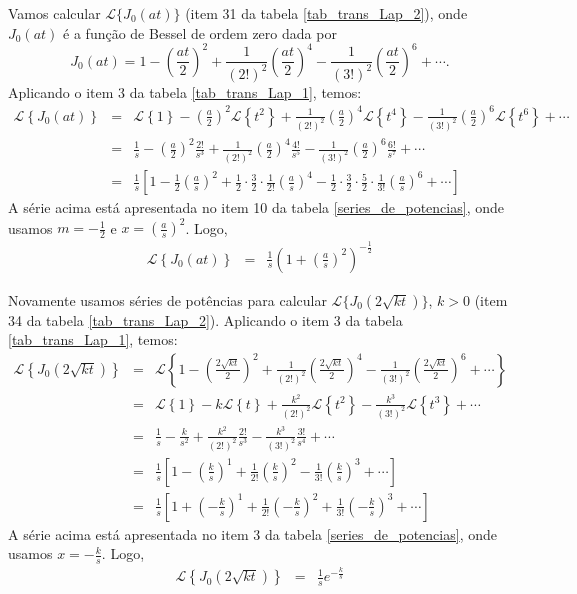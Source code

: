 \documentclass[Main.tex]{subfiles}
\begin{document}
\begin{ex}Vamos calcular $\mathcal{L}\{J_0(at)\}$ (item 31 da tabela \ref{tab_trans_Lap_2}), onde $J_0(at)$ é a função de Bessel de ordem zero dada por
$$
J_0(at)=1-\left(\frac{at}{2}\right)^2+\frac{1}{(2!)^2}\left(\frac{at}{2}\right)^4-\frac{1}{(3!)^2}\left(\frac{at}{2}\right)^6+\cdots.
$$
Aplicando o item 3 da tabela \ref{tab_trans_Lap_1}, temos:
\begin{eqnarray*}
\mathcal{L}\left\{J_0(at)\right\}&=&\mathcal{L}\left\{1\right\}-\left(\frac{a}{2}\right)^2\mathcal{L}\left\{t^2\right\}+\frac{1}{(2!)^2}\left(\frac{a}{2}\right)^4\mathcal{L}\left\{t^4\right\}-\frac{1}{(3!)^2}\left(\frac{a}{2}\right)^6\mathcal{L}\left\{t^6\right\}+\cdots\\
&=&\frac{1}{s}-\left(\frac{a}{2}\right)^2\frac{2!}{s^3}+\frac{1}{(2!)^2}\left(\frac{a}{2}\right)^4\frac{4!}{s^5}-\frac{1}{(3!)^2}\left(\frac{a}{2}\right)^6\frac{6!}{s^7}+\cdots\\
&=&\frac{1}{s}\left[1-\frac{1}{2}\left(\frac{a}{s}\right)^2+\frac{1}{2}\cdot \frac{3}{2}\cdot \frac{1}{2!}\left(\frac{a}{s}\right)^4-\frac{1}{2}\cdot\frac{3}{2}\cdot \frac{5}{2}\cdot\frac{1}{3!} \left(\frac{a}{s}\right)^6+\cdots\right]
\end{eqnarray*}
A série acima está apresentada no item 10 da tabela \ref{series_de_potencias}, onde usamos $m=-\frac{1}{2}$ e $x=\left(\frac{a}{s}\right)^2$. Logo,
\begin{eqnarray*}
\mathcal{L}\left\{J_0(at)\right\}&=&\frac{1}{s}\left(1+\left(\frac{a}{s}\right)^2\right)^{-\frac{1}{2}}
\end{eqnarray*}
\end{ex}
\begin{ex}Novamente usamos séries de potências para calcular $\mathcal{L}\{J_0(2\sqrt{kt})\}$, $k>0$ (item 34 da tabela \ref{tab_trans_Lap_2}). Aplicando o item 3 da tabela \ref{tab_trans_Lap_1}, temos:
\begin{eqnarray*}
\mathcal{L}\left\{J_0(2\sqrt{kt})\right\}&=&\mathcal{L}\left\{1-\left(\frac{2\sqrt{kt}}{2}\right)^2+\frac{1}{(2!)^2}\left(\frac{2\sqrt{kt}}{2}\right)^4-\frac{1}{(3!)^2}\left(\frac{2\sqrt{kt}}{2}\right)^6+\cdots\right\}\\
&=&\mathcal{L}\left\{1\right\}-k\mathcal{L}\left\{t\right\}+\frac{k^2}{(2!)^2}\mathcal{L}\left\{t^2\right\}-\frac{k^3}{(3!)^2}\mathcal{L}\left\{t^3\right\}+\cdots\\
&=&\frac{1}{s}-\frac{k}{s^2}+\frac{k^2}{(2!)^2}\frac{2!}{s^3}-\frac{k^3}{(3!)^2}\frac{3!}{s^4}+\cdots\\
&=&\frac{1}{s}\left[1-\left(\frac{k}{s}\right)^1+\frac{1}{2!}\left(\frac{k}{s}\right)^2-\frac{1}{3!}\left(\frac{k}{s}\right)^3+\cdots\right]\\
&=&\frac{1}{s}\left[1+\left(-\frac{k}{s}\right)^1+\frac{1}{2!}\left(-\frac{k}{s}\right)^2+\frac{1}{3!}\left(-\frac{k}{s}\right)^3+\cdots\right]
\end{eqnarray*}
A série acima está apresentada no item 3 da tabela \ref{series_de_potencias}, onde usamos $x=-\frac{k}{s}$. Logo,
\begin{eqnarray*}
\mathcal{L}\left\{J_0(2\sqrt{kt})\right\}&=&\frac{1}{s}e^{-\frac{k}{s}}
\end{eqnarray*}
\end{ex}
\end{document}
